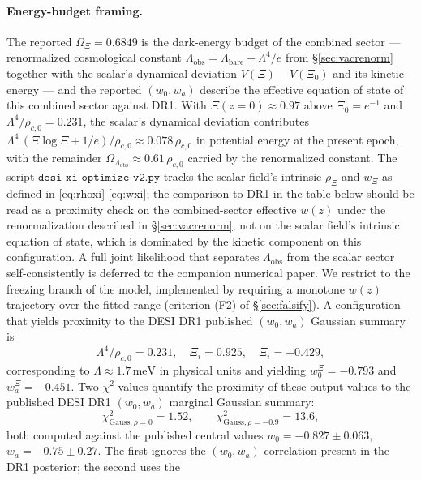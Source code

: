 \documentclass[11pt,reqno]{amsart}
\theoremstyle{plain}
\theoremstyle{definition}
\theoremstyle{remark}
\begin{document}
\paragraph{Energy-budget framing.}
The reported $\Omega_\Xi = 0.6849$ is the dark-energy budget of the
combined sector --- renormalized cosmological constant
$\Lambda_\mathrm{obs} = \Lambda_\mathrm{bare} - \Lambda^{4}/e$ from
\S\ref{sec:vacrenorm} together with the scalar's dynamical
deviation $V(\Xi) - V(\Xi_0)$ and its kinetic energy --- and the
reported $(w_0, w_a)$ describe the effective equation of state of
this combined sector against DR1. With
$\Xi(z=0) \approx 0.97$ above $\Xi_0 = e^{-1}$ and
$\Lambda^{4}/\rho_{c,0} = 0.231$, the scalar's dynamical
deviation contributes $\Lambda^{4}\,(\Xi\log\Xi + 1/e)/\rho_{c,0}
\approx 0.078\,\rho_{c,0}$ in potential energy at the present
epoch, with the remainder $\Omega_{\Lambda_\mathrm{obs}}
\approx 0.61\,\rho_{c,0}$ carried by the renormalized constant.
The script $\texttt{desi\_xi\_optimize\_v2.py}$ tracks the scalar
field's intrinsic $\rho_\Xi$ and $w_\Xi$ as defined in
\eqref{eq:rhoxi}-\eqref{eq:wxi}; the comparison to DR1 in
the table below should be read as a proximity check on the
combined-sector effective $w(z)$ under the renormalization
described in \S\ref{sec:vacrenorm}, not on the scalar field's
intrinsic equation of state, which is dominated by the kinetic
component on this configuration. A full joint
likelihood that separates $\Lambda_\mathrm{obs}$ from the scalar
sector self-consistently is deferred to the companion numerical
paper. We restrict to the freezing branch of the
model, implemented by requiring a monotone $w(z)$ trajectory over the
fitted range (criterion (F2) of \S\ref{sec:falsify}). A configuration
that yields proximity to the DESI DR1 published $(w_0, w_a)$ Gaussian
summary is
\begin{equation}\label{eq:desibestfit}
  \Lambda^{4}/\rho_{c,0} = 0.231,
  \quad \Xi_i = 0.925,
  \quad \dot\Xi_i = +0.429,
\end{equation}
corresponding to $\Lambda \approx 1.7\,\text{meV}$ in physical units and
yielding $w_0^{\Xi} = -0.793$ and $w_a^{\Xi} = -0.451$. Two
$\chi^{2}$ values quantify the proximity of these output values to
the published DESI DR1 $(w_0, w_a)$ marginal Gaussian summary:
\[
  \chi^{2}_{\text{Gauss},\rho=0} = 1.52,\qquad
  \chi^{2}_{\text{Gauss},\rho=-0.9} = 13.6,
\]
both computed against the published central values $w_0 = -0.827 \pm
0.063$, $w_a = -0.75 \pm 0.27$. The first ignores the $(w_0, w_a)$
correlation present in the DR1 posterior; the second uses the
\end{document}
